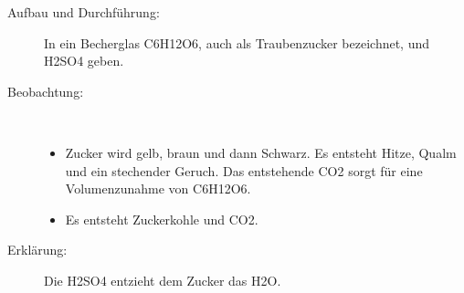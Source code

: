 \begin{description}
	\item[Aufbau und Durchführung:] In ein Becherglas \ac{C6H12O6},
		auch als Traubenzucker bezeichnet, und \ac{H2SO4} geben.
	\item[Beobachtung:]~
	\begin{itemize}
		\item Zucker wird gelb, braun und dann Schwarz.
			Es entsteht Hitze, Qualm und ein stechender Geruch.
			Das entstehende \ac{CO2} sorgt für eine Volumenzunahme
			von \ac{C6H12O6}.
		\item Es entsteht Zuckerkohle und \ac{CO2}.
	\end{itemize}
	\item[Erklärung:] Die \ac{H2SO4} entzieht dem Zucker das \ac{H2O}.
\end{description}

